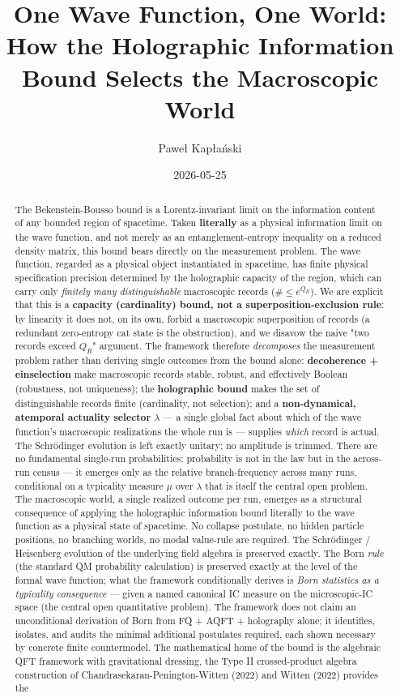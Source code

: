 \documentclass[11pt,a4paper]{article}
\title{One Wave Function, One World: How the Holographic Information Bound Selects the Macroscopic World}
\author{Paweł Kapłański}
\date{2026-05-25}
\begin{document}
\maketitle

\begin{abstract}
\noindent The Bekenstein-Bousso bound is a Lorentz-invariant limit on the information content of any bounded region of spacetime. Taken \textbf{literally} as a physical information limit on the wave function, and not merely as an entanglement-entropy inequality on a reduced density matrix, this bound bears directly on the measurement problem. The wave function, regarded as a physical object instantiated in spacetime, has finite physical specification precision determined by the holographic capacity of the region, which can carry only \emph{finitely many distinguishable} macroscopic records ($\# \le e^{Q_R}$). We are explicit that this is a \textbf{capacity (cardinality) bound, not a superposition-exclusion rule}: by linearity it does not, on its own, forbid a macroscopic superposition of records (a redundant zero-entropy cat state is the obstruction), and we disavow the naive "two records exceed $Q_R$" argument. The framework therefore \emph{decomposes} the measurement problem rather than deriving single outcomes from the bound alone: \textbf{decoherence + einselection} make macroscopic records stable, robust, and effectively Boolean (robustness, not uniqueness); the \textbf{holographic bound} makes the set of distinguishable records finite (cardinality, not selection); and a \textbf{non-dynamical, atemporal actuality selector $\lambda$} — a single global fact about which of the wave function's macroscopic realizations the whole run is — supplies \emph{which} record is actual. The Schrödinger evolution is left exactly unitary; no amplitude is trimmed. There are no fundamental single-run probabilities: probability is not in the law but in the across-run census — it emerges only as the relative branch-frequency across many runs, conditional on a typicality measure $\mu$ over $\lambda$ that is itself the central open problem. The macroscopic world, a single realized outcome per run, emerges as a structural consequence of applying the holographic information bound literally to the wave function as a physical state of spacetime. No collapse postulate, no hidden particle positions, no branching worlds, no modal value-rule are required. The Schrödinger / Heisenberg evolution of the underlying field algebra is preserved exactly. The Born \emph{rule} (the standard QM probability calculation) is preserved exactly at the level of the formal wave function; what the framework conditionally derives is \emph{Born statistics as a typicality consequence} — given a named canonical IC measure on the microscopic-IC space (the central open quantitative problem). The framework does not claim an unconditional derivation of Born from FQ + AQFT + holography alone; it identifies, isolates, and audits the minimal additional postulates required, each shown necessary by concrete finite countermodel. The mathematical home of the bound is the algebraic QFT framework with gravitational dressing, the Type II crossed-product algebra construction of Chandrasekaran-Penington-Witten (2022) and Witten (2022) provides the 
\end{abstract}
\end{document}

